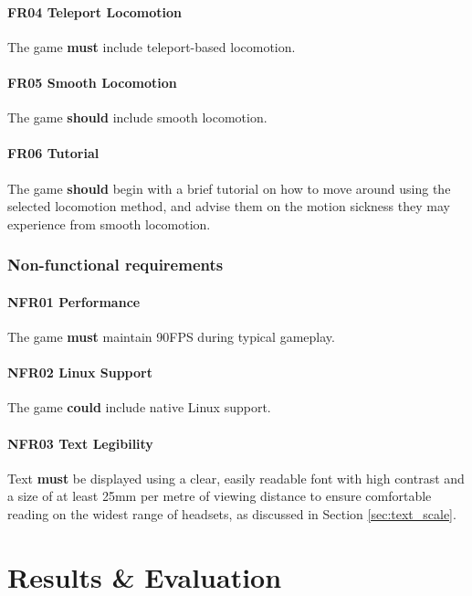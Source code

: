 \documentclass[sigconf,authordraft]{acmart}
\begin{document}
\paragraph{FR04 Teleport Locomotion}
The game \textbf{must} include teleport-based locomotion.

\paragraph{FR05 Smooth Locomotion}
The game \textbf{should} include smooth locomotion.

\paragraph{FR06 Tutorial}
The game \textbf{should} begin with a brief tutorial on how to move around
using the selected locomotion method, and advise them on the motion sickness
they may experience from smooth locomotion.

\subsubsection{Non-functional requirements}

\paragraph{\label{sec:nfr_performance}NFR01 Performance}
The game \textbf{must} maintain 90FPS during typical gameplay.

\paragraph{NFR02 Linux Support}
The game \textbf{could} include native Linux support.

\paragraph{NFR03 Text Legibility}
Text \textbf{must} be displayed using a clear, easily readable font with high
contrast and a size of at least 25mm per metre of viewing distance to ensure
comfortable reading on the widest range of headsets, as discussed in Section
\ref{sec:text_scale}.

\section{Results \& Evaluation}
\end{document}
